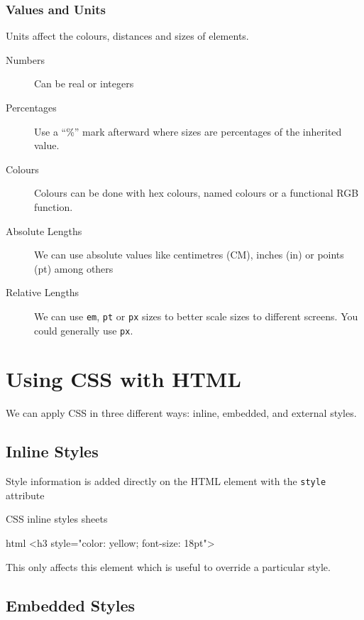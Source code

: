 \subsubsection{Values and Units}\label{ssub:values_and_units}

Units affect the colours, distances and sizes of elements.
\begin{description}
	\item[Numbers] Can be real or integers
	\item[Percentages] Use a ``\%'' mark afterward where sizes are percentages of the inherited value.
	\item[Colours] Colours can be done with hex colours, named colours or a functional RGB function.
	\item[Absolute Lengths] We can use absolute values like centimetres (CM), inches (in) or points (pt) among others
	\item[Relative Lengths] We can use \texttt{em}, \texttt{pt} or \texttt{px} sizes to better scale sizes to different screens.
		You could generally use \texttt{px}.
\end{description}

\section{Using CSS with HTML}\label{sec:using_css_with_html}

We can apply CSS in three different ways: inline, embedded, and external styles.

\subsection{Inline Styles}\label{sub:inline_styles}

Style information is added directly on the HTML element with the \texttt{style} attribute
\begin{highlight}{CSS inline styles sheets}
	\begin{code}{html}
		<h3 style="color: yellow; font-size: 18pt">
	\end{code}
\end{highlight}
This only affects this element which is useful to override a particular style.

\subsection{Embedded Styles}\label{sub:embedded_styles}

